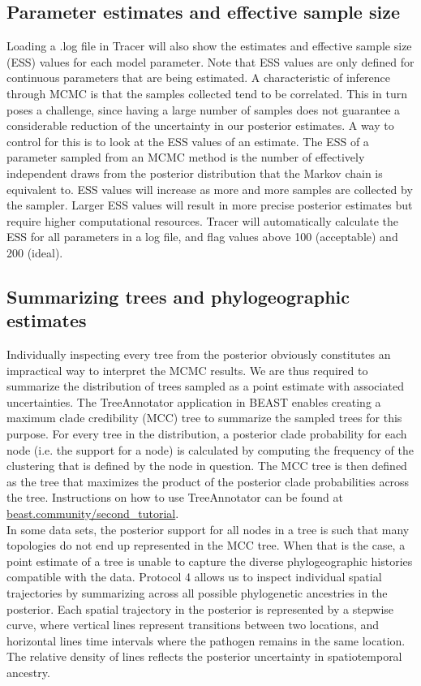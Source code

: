 \documentclass{article}
\begin{document}
\subsection*{Parameter estimates and effective sample size}

Loading a .log file in Tracer will also show the estimates and effective sample size (ESS) values for each model parameter.
Note that ESS values are only defined for continuous parameters that are being estimated.
A characteristic of inference through MCMC is that the samples collected tend to be correlated.
This in turn poses a challenge, since having a large number of samples does not guarantee a considerable reduction of the uncertainty in our posterior estimates.
A way to control for this is to look at the ESS values of an estimate.
The ESS of a parameter sampled from an MCMC method is the number of effectively independent draws from the posterior distribution that the Markov chain is equivalent to.
ESS values will increase as more and more samples are collected by the sampler.
Larger ESS values will result in more precise posterior estimates but require higher computational resources.
Tracer will automatically calculate the ESS for all parameters in a log file, and flag values above 100 (acceptable) and 200 (ideal).

\subsection*{Summarizing trees and phylogeographic estimates}

Individually inspecting every tree from the posterior obviously constitutes an impractical way to interpret the MCMC results. We are thus required to summarize the distribution of trees sampled as a point estimate with associated uncertainties. The TreeAnnotator application in BEAST enables creating a maximum clade credibility (MCC) tree to summarize the sampled trees for this purpose. For every tree in the distribution, a posterior clade probability for each node (i.e. the support for a node) is calculated by computing the frequency of the clustering that is defined by the node in question. The MCC tree is then defined as the tree that maximizes the product of the posterior clade probabilities across the tree. Instructions on how to use TreeAnnotator can be found at \url{beast.community/second_tutorial}. \\

In some data sets, the posterior support for all nodes in a tree is such that many topologies do not end up represented in the MCC tree.
When that is the case, a point estimate of a tree is unable to capture the diverse phylogeographic histories compatible with the data. Protocol 4 allows us to inspect individual spatial trajectories by summarizing across all possible phylogenetic ancestries in the posterior. Each spatial trajectory in the posterior is represented by a stepwise curve, where vertical lines represent transitions between two locations, and horizontal lines time intervals where the pathogen remains in the same location. The relative density of lines reflects the posterior uncertainty in spatiotemporal ancestry. %
\end{document}
